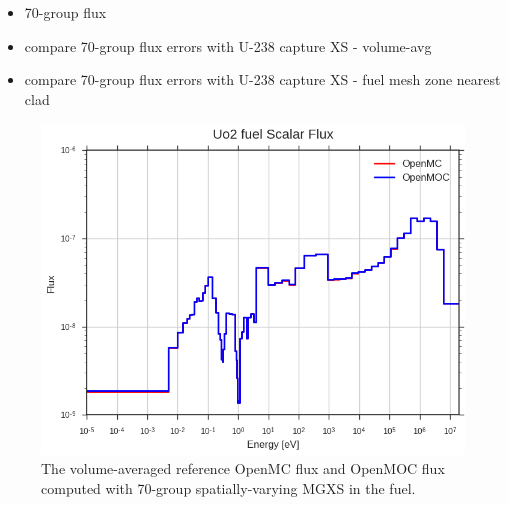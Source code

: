 \begin{itemize}
  \item 70-group flux
  \item compare 70-group flux errors with U-238 capture XS - volume-avg
  \item compare 70-group flux errors with U-238 capture XS - fuel mesh zone nearest clad
\end{itemize}

\begin{figure}[h!]
  \centering
  \includegraphics[width=0.9\linewidth]{figures/biases/pin-cell/flux-uo2-fuel}
\caption[Spatially-varying scalar flux a 2D fuel pin.]{The volume-averaged reference OpenMC flux and OpenMOC flux computed with 70-group spatially-varying \ac{MGXS} in the fuel.}
\label{fig:chap2-pin-flux}
\end{figure}

